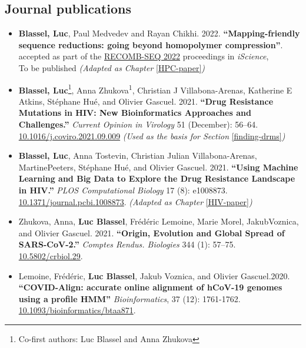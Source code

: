\documentclass[
  11pt,
  twoside,
  BCOR=10mm,
  listof=totoc]{scrbook}
\begin{document}
\hypertarget{journal-publications}{%
\subsection*{Journal publications}\label{journal-publications}}

\begin{itemize}
\item
  \textbf{Blassel, Luc}, Paul Medvedev and Rayan Chikhi. 2022. \textbf{``Mapping-friendly sequence reductions: going beyond homopolymer compression''}. accepted as part of the \href{https://recomb2022.net/recomb-seq/}{RECOMB-SEQ 2022} proceedings in \emph{iScience},\\
  To be published \emph{(Adapted as Chapter} \ref{HPC-paper}\emph{)}
\item
  \textbf{Blassel, Luc}\footnote{Co-first authors: Luc Blassel and Anna Zhukova}, Anna Zhukova\textsuperscript{1}, Christian J Villabona-Arenas, Katherine E Atkins, Stéphane Hué, and Olivier Gascuel. 2021. \textbf{``Drug Resistance Mutations in HIV: New Bioinformatics Approaches and Challenges.''} \emph{Current Opinion in Virology} 51 (December): 56--64.\\
  \href{https://doi.org/10.1016/j.coviro.2021.09.009}{10.1016/j.coviro.2021.09.009} \emph{(Used as the basis for Section} \ref{finding-drms}\emph{)}
\item
  \textbf{Blassel, Luc}, Anna Tostevin, Christian Julian Villabona-Arenas, MartinePeeters, Stéphane Hué, and Olivier Gascuel. 2021. \textbf{``Using Machine Learning and Big Data to Explore the Drug Resistance Landscape in HIV.''} \emph{PLOS Computational Biology} 17 (8): e1008873.\\
  \href{https://doi.org/10.1371/journal.pcbi.1008873}{10.1371/journal.pcbi.1008873}. \emph{(Adapted as Chapter} \ref{HIV-paper}\emph{)}
\item
  Zhukova, Anna, \textbf{Luc Blassel}, Frédéric Lemoine, Marie Morel, JakubVoznica, and Olivier Gascuel. 2021. \textbf{``Origin, Evolution and Global Spread of SARS-CoV-2.''} \emph{Comptes Rendus. Biologies} 344 (1): 57--75.\\
  \href{https://doi.org/10.5802/crbiol.29}{10.5802/crbiol.29}.
\item
  Lemoine, Frédéric, \textbf{Luc Blassel}, Jakub Voznica, and Olivier Gascuel.2020. \textbf{``COVID-Align: accurate online alignment of hCoV-19 genomes using a profile HMM''} \emph{Bioinformatics}, 37 (12): 1761-1762.\\
  \href{https://doi.org/10.1093/bioinformatics/btaa871}{10.1093/bioinformatics/btaa871}.
\end{itemize}
\end{document}
